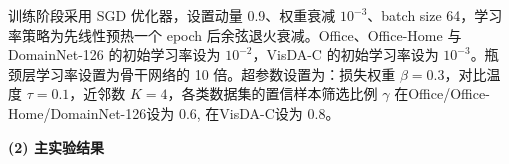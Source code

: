 训练阶段采用 SGD 优化器，设置动量 0.9、权重衰减 $10^{-3}$、batch size 64，学习率策略为先线性预热一个 epoch 后余弦退火衰减。Office、Office-Home 与 DomainNet-126 的初始学习率设为 $10^{-2}$，VisDA-C 的初始学习率设为 $10^{-3}$。瓶颈层学习率设置为骨干网络的 10 倍。超参数设置为：损失权重 $\beta = 0.3$，对比温度 $\tau = 0.1$，近邻数 $K = 4$，各类数据集的置信样本筛选比例 $\gamma$ 在Office/Office-Home/DomainNet-126设为 0.6, 在VisDA-C设为 0.8。

\noindent\textbf{(2) 主实验结果}

\begin{table}[!htbp]
  \vspace{0.5em}\centering\wuhao
  

\end{table}
